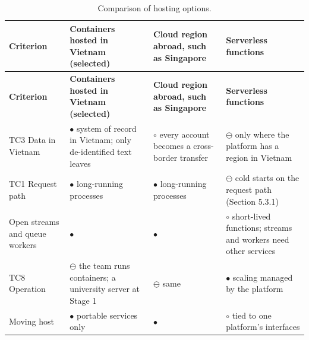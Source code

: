 {\small
\begin{longtable}{|>{\raggedright\arraybackslash}p{}|>{\raggedright\arraybackslash}p{}|>{\raggedright\arraybackslash}p{}|>{\raggedright\arraybackslash}p{}|}
\caption{Comparison of hosting options.} \\
\hline
\textbf{Criterion} & \textbf{Containers hosted in Vietnam (selected)} & \textbf{Cloud region abroad, such as Singapore} & \textbf{Serverless functions} \\ \hline
\endfirsthead
\hline
\textbf{Criterion} & \textbf{Containers hosted in Vietnam (selected)} & \textbf{Cloud region abroad, such as Singapore} & \textbf{Serverless functions} \\ \hline
\endhead
TC3 Data in Vietnam & $\bullet$ system of record in Vietnam; only de-\allowbreak{}identified text leaves & $\circ$ every account becomes a cross-\allowbreak{}border transfer\cite{r99} & $\ominus$ only where the platform has a region in Vietnam \\ \hline
TC1 Request path & $\bullet$ long-\allowbreak{}running processes & $\bullet$ long-\allowbreak{}running processes & $\ominus$ cold starts on the request path (Section 5.3.1) \\ \hline
Open streams and queue workers & $\bullet$ & $\bullet$ & $\circ$ short-lived functions; streams and workers need other services \\ \hline
TC8 Operation & $\ominus$ the team runs containers; a university server at Stage 1 & $\ominus$ same & $\bullet$ scaling managed by the platform \\ \hline
Moving host & $\bullet$ portable services only & $\bullet$ & $\circ$ tied to one platform's interfaces \\ \hline
\end{longtable}
}

